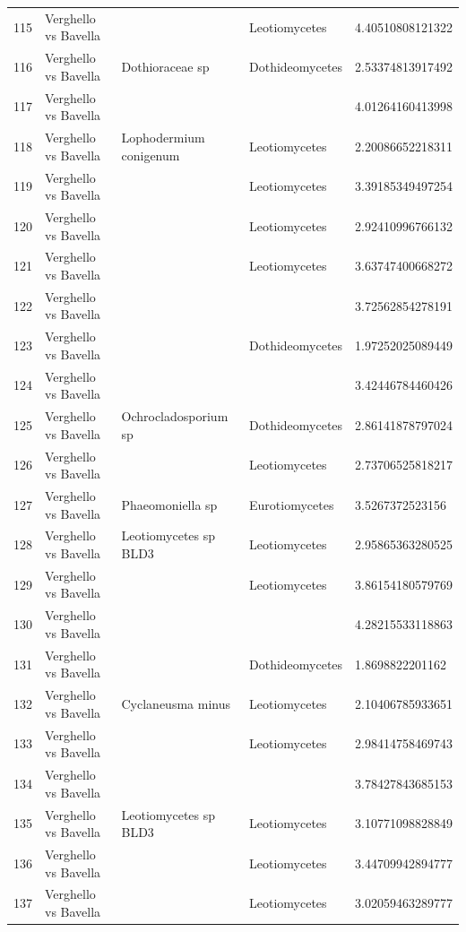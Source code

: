\documentclass[12pt]{article}\usepackage[]{graphicx}\usepackage[]{color}
\numberwithin{figure}{section}
\begin{document}
\begin{table}[ht]
\begin{tabular}{lllll}
  115 & Verghello vs Bavella &  & Leotiomycetes & 4.40510808121322 \\ 
  116 & Verghello vs Bavella & Dothioraceae sp & Dothideomycetes & 2.53374813917492 \\ 
  117 & Verghello vs Bavella &  &  & 4.01264160413998 \\ 
  118 & Verghello vs Bavella & Lophodermium conigenum & Leotiomycetes & 2.20086652218311 \\ 
  119 & Verghello vs Bavella &  & Leotiomycetes & 3.39185349497254 \\ 
  120 & Verghello vs Bavella &  & Leotiomycetes & 2.92410996766132 \\ 
  121 & Verghello vs Bavella &  & Leotiomycetes & 3.63747400668272 \\ 
  122 & Verghello vs Bavella &  &  & 3.72562854278191 \\ 
  123 & Verghello vs Bavella &  & Dothideomycetes & 1.97252025089449 \\ 
  124 & Verghello vs Bavella &  &  & 3.42446784460426 \\ 
  125 & Verghello vs Bavella & Ochrocladosporium sp & Dothideomycetes & 2.86141878797024 \\ 
  126 & Verghello vs Bavella &  & Leotiomycetes & 2.73706525818217 \\ 
  127 & Verghello vs Bavella & Phaeomoniella sp & Eurotiomycetes & 3.5267372523156 \\ 
  128 & Verghello vs Bavella & Leotiomycetes sp BLD3 & Leotiomycetes & 2.95865363280525 \\ 
  129 & Verghello vs Bavella &  & Leotiomycetes & 3.86154180579769 \\ 
  130 & Verghello vs Bavella &  &  & 4.28215533118863 \\ 
  131 & Verghello vs Bavella &  & Dothideomycetes & 1.8698822201162 \\ 
  132 & Verghello vs Bavella & Cyclaneusma minus & Leotiomycetes & 2.10406785933651 \\ 
  133 & Verghello vs Bavella &  & Leotiomycetes & 2.98414758469743 \\ 
  134 & Verghello vs Bavella &  &  & 3.78427843685153 \\ 
  135 & Verghello vs Bavella & Leotiomycetes sp BLD3 & Leotiomycetes & 3.10771098828849 \\ 
  136 & Verghello vs Bavella &  & Leotiomycetes & 3.44709942894777 \\ 
  137 & Verghello vs Bavella &  & Leotiomycetes & 3.02059463289777 \\ 

\end{tabular}
\end{table}
\end{document}
